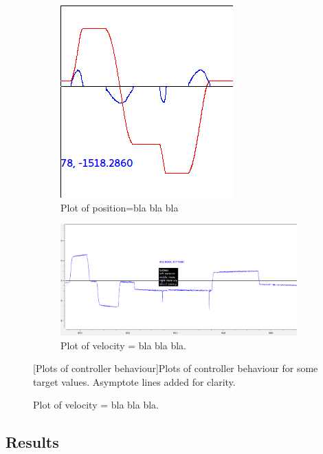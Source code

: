 \documentclass[11pt]{article}
\begin{document}
\begin{figure}[h]
  \begin{subfigure}[b]{.45\textwidth}
    \includegraphics[width=.5\textwidth]{figures/posplot.png}
    \caption{Plot of position=bla bla bla}\label{fig:pos}
  \end{subfigure} 
  \begin{subfigure}[b]{.45\textwidth}
    \includegraphics[width=.5\textwidth]{figures/velplot.png}
    \caption{Plot of velocity = bla bla bla.}    \label{fig:ve}
  \end{subfigure}
  [Plots of controller behaviour]{Plots of controller behaviour for some target values. Asymptote lines added for clarity.}
\end{figure}
\subsection{Results}
\end{document}
